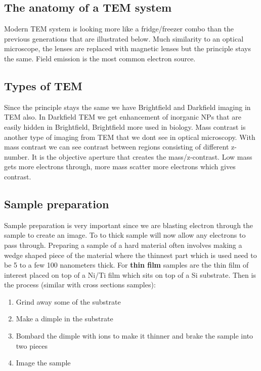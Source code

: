 	\subsection{The anatomy of a TEM system}
	Modern TEM system is looking more like a fridge/freezer combo than the previous generations that are illustrated below. Much similarity to an optical microscope, the lenses are replaced with magnetic lenses but the principle stays the same. Field emission is the most common electron source. 


	\subsection{Types of TEM}
	Since the principle stays the same we have Brightfield and Darkfield imaging in TEM also. In Darkfield TEM we get enhancement of inorganic NPs that are easily hidden in Brightfield, Brightfield more used in biology. Mass contrast is another type of imaging from TEM that we dont see in optical microscopy. With mass contrast we can see contrast between regions consisting of different z-number. It is the objective aperture that creates the mass/z-contrast. Low mass gets more electrons through, more mass scatter more electrons which gives contrast. 

	\subsection{Sample preparation}
	Sample preparation is very important since we are blasting electron through the sample to create an image. To to thick sample will now allow any electrons to pass through. Preparing a sample of a hard material often involves making a wedge shaped piece of the material where the thinnest part which is used need to be 5 to a few 100 nanometers thick. For \textbf{thin film} samples are the thin film of interest placed on top of a Ni/Ti film which sits on top of a Si substrate. Then is the process (similar with cross sections samples):

		\begin{enumerate}
		  	\item Grind away some of the substrate 
		  	\item Make a dimple in the substrate
		  	\item Bombard the dimple with ions to make it thinner and brake the sample into two pieces
		  	\item Image the sample
		\end{enumerate}  
	  
